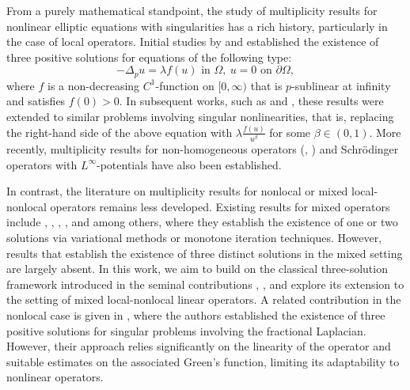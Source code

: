 \documentclass[reqno,oneside]{amsart}
\theoremstyle{definition}
\theoremstyle{remark}
\numberwithin{equation}{section}
\newcommand{\p}{\Delta_p}
\newcommand{\la} {\lambda}
\newcommand{\ba}{\beta}
\newcommand{\Om} {\Omega}
\newcommand{\pa}{\partial}
\begin{document}
From a purely mathematical standpoint, the study of multiplicity results for nonlinear elliptic equations with singularities has a rich history, particularly in the case of local operators. Initial studies by \cite{brown1981s} and \cite{ramaswamy2004multiple} established the existence of three positive solutions for equations of the following type: 
 \[-\p u = \la f(u) \text{ in } \Omega ,\ u = 0 \text{ on } \pa\Om,\]
where $f$ is a non-decreasing $C^1$-function on $[0,\infty)$ that is $p$-sublinear at infinity and satisfies $f(0)>0$. In subsequent works, such as \cite{dhanya2015three} and \cite{ko2011multiplicity}, these results were extended to similar problems involving singular nonlinearities, that is, replacing the right-hand side of the above equation with $\la \frac{f(u)}{u^{\ba}}$ for some $\ba\in(0,1)$. More recently, multiplicity results for non-homogeneous operators (\cite{acharya2021existence}, \cite{arora2021multiplicity}) and Schr\"odinger operators with $L^{\infty}$-potentials \cite{ko2024multiplicity} have also been established. 

In contrast, the literature on multiplicity results for nonlocal or mixed local-nonlocal operators remains less developed. Existing results for mixed operators include \cite{garain2022mixed}, \cite{arora2023combined}, \cite{garain2023class}, \cite{biroud2023mixed}, \cite{su2024multiple} and \cite{biagi2024multiplicity} among others, where they establish the existence of one or two solutions via variational methods or monotone iteration techniques. However, results that establish the existence of three distinct solutions in the mixed setting are largely absent. In this work, we aim to build on the classical three-solution framework introduced in the seminal contributions \cite{brown1981s}, \cite{ramaswamy2004multiple}, and explore its extension to the setting of mixed local-nonlocal linear operators. A related contribution in the nonlocal case is given in \cite{giacomoni2019existence}, where the authors established the existence of three positive solutions for singular problems involving the fractional Laplacian. However, their approach relies significantly on the linearity of the operator and suitable estimates on the associated Green's function, limiting its adaptability to nonlinear operators.
\end{document}
